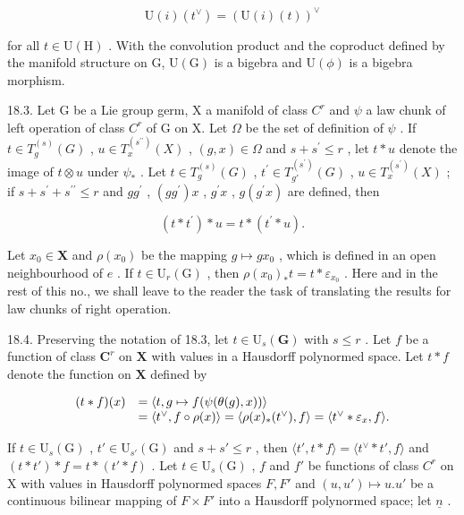 \[
\mathrm{U} (i) \left(t ^ {\vee}\right) = \left(\mathrm{U} (i) (t)\right) ^ {\vee}
\]

for all \(t \in \mathrm{U}(\mathrm{H})\) . With the convolution product and the coproduct defined by the manifold structure on G, \(\mathrm{U}(\mathrm{G})\) is a bigebra and \(\mathrm{U}(\phi)\) is a bigebra morphism.

18.3. Let G be a Lie group germ, X a manifold of class \(C^{r}\) and \(\psi\) a law chunk of left operation of class \(C^{r}\) of G on X. Let \(\Omega\) be the set of definition of \(\psi\) . If \(t \in T_{g}^{(s)}(G)\) , \(u \in T_{x}^{(s^{\prime\prime})}(X)\) , \((g, x) \in \Omega\) and \(s + s^{\prime} \leqslant r\) , let \(t * u\) denote the image of \(t \otimes u\) under \(\psi_{*}\) . Let \(t \in T_{g}^{(s)}(G)\) , \(t^{\prime} \in T_{g'}^{(s^{\prime})}(G)\) , \(u \in T_{x}^{(s^{\prime})}(X)\) ; if \(s + s^{\prime} + s^{\prime\prime} \leqslant r\) and \(gg^{\prime}\) , \((gg^{\prime})x\) , \(g^{\prime}x\) , \(g(g^{\prime}x)\) are defined, then

\[
(t * t ^ {\prime}) * u = t * (t ^ {\prime} * u).
\]

Let \(x_0 \in \mathbf{X}\) and \(\rho(x_0)\) be the mapping \(g \mapsto gx_0\) , which is defined in an open neighbourhood of \(e\) . If \(t \in \mathrm{U}_r(\mathrm{G})\) , then \(\rho(x_0)_*t = t * \varepsilon_{x_0}\) . Here and in the rest of this no., we shall leave to the reader the task of translating the results for law chunks of right operation.

18.4. Preserving the notation of 18.3, let \(t \in \mathrm{U}_s(\mathbf{G})\) with \(s \leqslant r\) . Let \(f\) be a function of class \(\mathbf{C}^r\) on \(\mathbf{X}\) with values in a Hausdorff polynormed space. Let \(t * f\) denote the function on \(\mathbf{X}\) defined by

\[
\begin{array}{r l} (t * f) (x) & = \langle t, g \mapsto f (\psi (\theta (g), x)) \rangle \\ & = \langle t ^ {\vee}, f \circ \rho (x) \rangle = \langle \rho (x) _ {*} (t ^ {\vee}), f \rangle = \langle t ^ {\vee} * \varepsilon_ {x}, f \rangle . \end{array}
\]

If \(t \in \mathrm{U}_s(\mathrm{G})\) , \(t' \in \mathrm{U}_{s'}(\mathrm{G})\) and \(s + s' \leqslant r\) , then \(\langle t', t * f \rangle = \langle t^\vee * t', f \rangle\) and \((t * t') * f = t * (t' * f)\) . Let \(t \in \mathrm{U}_s(\mathrm{G})\) , \(f\) and \(f'\) be functions of class \(C^r\) on X with values in Hausdorff polynormed spaces \(F, F'\) and \((u, u') \mapsto u. u'\) be a continuous bilinear mapping of \(F \times F'\) into a Hausdorff polynormed space; let \(\underline{n}\) .

